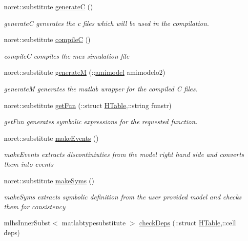 \begin{DoxyCompactItemize}
noret\+::substitute \mbox{\hyperlink{classamimodel_a73df9b3d523823e7a0105916471f13f5}{generateC}} ()
\begin{DoxyCompactList}\small\item\em generateC generates the c files which will be used in the compilation. \end{DoxyCompactList}\item 
noret\+::substitute \mbox{\hyperlink{classamimodel_abf720a0c3104977029538e3b19d429bb}{compileC}} ()
\begin{DoxyCompactList}\small\item\em compileC compiles the mex simulation file \end{DoxyCompactList}\item 
noret\+::substitute \mbox{\hyperlink{classamimodel_a6e93ea24824d9d90c322960e6d78fed0}{generateM}} (\+::\mbox{\hyperlink{classamimodel}{amimodel}} amimodelo2)
\begin{DoxyCompactList}\small\item\em generateM generates the matlab wrapper for the compiled C files. \end{DoxyCompactList}\item 
noret\+::substitute \mbox{\hyperlink{classamimodel_a08d58ae650e5ff9310760f6d3f08015c}{get\+Fun}} (\+::struct \mbox{\hyperlink{classamimodel_aafe6335df413dd688a2f44efba012cf1}{H\+Table}},\+::string funstr)
\begin{DoxyCompactList}\small\item\em get\+Fun generates symbolic expressions for the requested function. \end{DoxyCompactList}\item 
noret\+::substitute \mbox{\hyperlink{classamimodel_a4d4b20c81af6d7ed977b6b818c7b22db}{make\+Events}} ()
\begin{DoxyCompactList}\small\item\em make\+Events extracts discontiniuties from the model right hand side and converts them into events \end{DoxyCompactList}\item 
noret\+::substitute \mbox{\hyperlink{classamimodel_a5aba9155145df4b3f70bfec887c25af9}{make\+Syms}} ()
\begin{DoxyCompactList}\small\item\em make\+Syms extracts symbolic definition from the user provided model and checks them for consistency \end{DoxyCompactList}\item 
mlhs\+Inner\+Subst$<$ matlabtypesubstitute $>$ \mbox{\hyperlink{classamimodel_ab566026e57f6cbce21a2a2c72b9f7f2b}{check\+Deps}} (\+::struct \mbox{\hyperlink{classamimodel_aafe6335df413dd688a2f44efba012cf1}{H\+Table}},\+::cell deps)

\end{DoxyCompactItemize}
